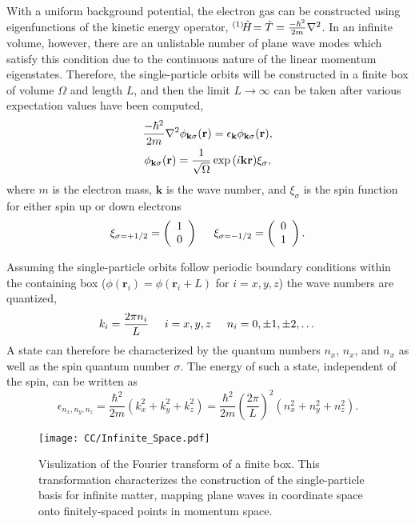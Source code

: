 \documentclass[thesis.tex]{subfiles}
\begin{document}
With a uniform background potential, the electron gas can be constructed using eigenfunctions of the kinetic energy operator, ${}^{\left(1\right)}\hspace{-2pt}\hat{H}\hspace{-2pt} = \hat{T}\hspace{-0.25pt} = \frac{-\hbar^{2}}{2m}\nabla^{2}$.  In an infinite volume, however, there are an unlistable number of plane wave modes which satisfy this condition due to the continuous nature of the linear momentum eigenstates.  Therefore, the single-particle orbits will be constructed in a finite box of volume $\Omega$ and length $L$, and then the limit $L\rightarrow \infty$ can be taken after various expectation values have been computed,
\begin{gather} \label{eq:plane_wave}
  \frac{-\hbar^{2}}{2m}\nabla^{2}\phi_{\mathbf{k}\sigma}(\mathbf{r}) = \epsilon_{\mathbf{k}}\phi_{\mathbf{k}\sigma}(\mathbf{r}), \notag \\
  \phi_{\mathbf{k}\sigma}(\mathbf{r}) = \frac{1}{\sqrt{\Omega}}\exp{(i\mathbf{kr})}\xi_{\sigma},
\end{gather}
where $m$ is the electron mass, $\mathbf{k}$ is the wave number, and $\xi_{\sigma}$ is the spin function for either spin up or down electrons
\begin{equation}
  \xi_{\sigma=+1/2} = \left(\begin{array}{c} 1
    \\ 0 \end{array}\right) \hspace{0.5cm}
  \xi_{\sigma=-1/2} = \left(\begin{array}{c} 0 \\ 1 \end{array}\right).
\end{equation}

Assuming the single-particle orbits follow periodic boundary conditions within the containing box ($\phi(\mathbf{r}_{i}) = \phi(\mathbf{r}_{i} + L)$ for $i = x,y,z$) the wave numbers are quantized,
\begin{equation}
  k_{i} = \frac{2\pi n_{i}}{L}\hspace{0.5cm} i = x,y,z \hspace{0.5cm} n_{i} = 0, \pm 1, \pm 2, \dots
\end{equation}
A state can therefore be characterized by the quantum numbers $n_{x}$, $n_{x}$, and $n_{x}$ as well as the spin quantum number $\sigma$.  The energy of such a state, independent of the spin, can be written as
\begin{equation} \label{eq:infinite_energy}
  \epsilon_{n_{x}, n_{y}, n_{z}} = \frac{\hbar^2}{2m}\left(k_{x}^{2} + k_{y}^{2} + k_{z}^{2}\right) = \frac{\hbar^{2}}{2m}\left(\frac{2\pi }{L}\right)^{2} \left( n_{x}^{2} + n_{y}^{2} + n_{z}^{2}\right).
\end{equation}
\begin{figure}[h]
  \centering
  \texttt{[image: CC/Infinite\_Space.pdf]}
  \caption{Visulization of the Fourier transform of a finite box.  This transformation characterizes the construction of the single-particle basis for infinite matter, mapping plane waves in coordinate space onto finitely-spaced points in momentum space.}
  \label{fig:infinite_space}
\end{figure}
\end{document}
